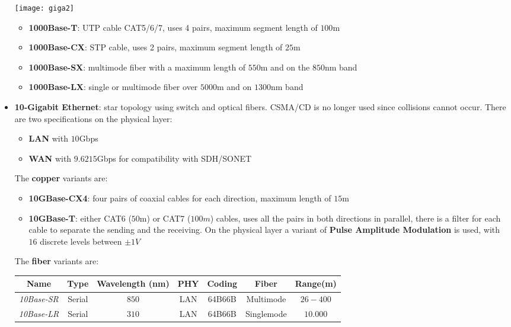 \begin{itemize}
	\begin{center}
		\texttt{[image: giga2]}
	\end{center}
	\begin{itemize}
		\item \textbf{1000Base-T}: UTP cable CAT5/6/7, uses 4 pairs, maximum segment length of $100$m
		\item \textbf{1000Base-CX}: STP cable, uses 2 pairs, maximum segment length of $25$m
		\item \textbf{1000Base-SX}: multimode fiber with a maximum length of $550$m and on the $850$nm band
		\item \textbf{1000Base-LX}: single or multimode fiber over $5000$m and on $1300$nm band
	\end{itemize}
	\item \textbf{10-Gigabit Ethernet}: star topology using switch and optical fibers. CSMA/CD is no longer used since collisions cannot occur. There are two specifications on the physical layer:
	\begin{itemize}
		\item \textbf{LAN} with $10$Gbps
		\item \textbf{WAN} with $9.6215$Gbps for compatibility with SDH/SONET
	\end{itemize}
	The \textbf{copper} variants are:
	\begin{itemize}
		\item \textbf{10GBase-CX4}: four pairs of coaxial cables for each direction, maximum length of $15$m
		\item \textbf{10GBase-T}: either CAT6 ($50$m) or CAT7 ($100m$) cables, uses all the pairs in both directions in parallel, there is a filter for each cable to separate the sending and the receiving. On the physical layer a variant of \textbf{Pulse Amplitude Modulation} is used, with $16$ discrete levels between $\pm 1V$
	\end{itemize}
	The \textbf{fiber} variants are:
	\begin{table}[!h]
		\centering
		\begin{tabular}{|c|c|c|c|c|c|c|}
			\hline
			\textbf{Name} & \textbf{Type} & \textbf{Wavelength (nm)} & \textbf{PHY} & \textbf{Coding} & \textbf{Fiber} & \textbf{Range(m)} \\
			\hline
			\textit{10Base-SR} & Serial\footnotemark& $850$ & LAN & 64B66B & Multimode & $26-400$\\
			\hline
			\textit{10Base-LR} & Serial & $310$ & LAN & 64B66B & Singlemode & $10.000$\\

\end{tabular}
\end{table}
\end{itemize}
